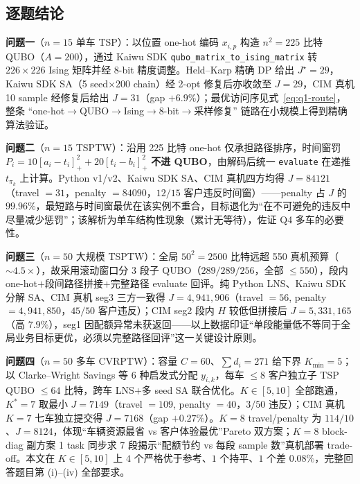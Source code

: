 \documentclass[UTF8,12pt,a4paper]{ctexart}
\begin{document}
\subsection{逐题结论}

\textbf{问题一}（$n=15$ 单车 TSP）：以位置 one-hot 编码 $x_{i,p}$ 构造 $n^{2}=225$ 比特 QUBO（$A=200$），通过 Kaiwu SDK \texttt{qubo\_matrix\_to\_ising\_matrix} 转 $226\!\times\!226$ Ising 矩阵并经 8-bit 精度调整。Held--Karp 精确 DP 给出 $J^{\star}\!=\!29$，Kaiwu SDK SA（5 seed$\times$200 chain）经 2-opt 修复后亦收敛至 $J\!=\!29$，CIM 真机 10 sample 经修复后给出 $J\!=\!31$（gap $+6.9\%$）；最优访问序见式~\eqref{eq:q1-route}，整条 ``one-hot$\to$QUBO$\to$Ising$\to$8-bit$\to$采样修复'' 链路在小规模上得到精确算法验证。

\textbf{问题二}（$n=15$ TSPTW）：沿用 225 比特 one-hot 仅承担路径排序，时间窗罚 $P_i=10[a_i\!-\!t_i]_+^2+20[t_i\!-\!b_i]_+^2$ \textbf{不进 QUBO}，由解码后统一 \texttt{evaluate} 在递推 $t_{\pi_k}$ 上计算。Python v1/v2、Kaiwu SDK SA、CIM 真机四方均得 $J\!=\!84121$（travel $\!=\!31$，penalty $\!=\!84090$，$12/15$ 客户违反时间窗）——penalty 占 $J$ 的 $99.96\%$，最短路与时间窗最优在该实例不重合，目标退化为``在不可避免的违反中尽量减少惩罚''；该解析为单车结构性现象（累计无等待），佐证 Q4 多车的必要性。

\textbf{问题三}（$n=50$ 大规模 TSPTW）：全局 $50^{2}\!=\!2500$ 比特远超 550 真机预算（$\sim 4.5\!\times$），故采用滚动窗口分 $3$ 段子 QUBO（$289/289/256$，全部 $\le 550$），段内 one-hot$+$段间路径拼接$+$完整路径 evaluate 回评。纯 Python LNS、Kaiwu SDK 分解 SA、CIM 真机 seg3 三方一致得 $J\!=\!4{,}941{,}906$（travel $\!=\!56$, penalty $\!=\!4{,}941{,}850$，$45/50$ 客户违反）；CIM seg2 段内 $H$ 较低但拼接后 $J\!=\!5{,}331{,}165$（高 $7.9\%$），seg1 因配额异常未获返回——以上数据印证``单段能量低不等同于全局业务目标更优，必须以完整路径回评''这一关键设计原则。

\textbf{问题四}（$n=50$ 多车 CVRPTW）：容量 $C\!=\!60$、$\sum d_i\!=\!271$ 给下界 $K_{\min}\!=\!5$；以 Clarke--Wright Savings 等 6 种启发式分配 $y_{i,k}$，每车 $\le 8$ 客户独立子 TSP QUBO $\le 64$ 比特，跨车 LNS$+$多 seed SA 联合优化。$K\!\in\![5,10]$ 全部跑通，$K^{*}\!=\!7$ 取最小 $J\!=\!7149$（travel $\!=\!109$, penalty $\!=\!40$，$3/50$ 违反）；CIM 真机 $K\!=\!7$ 七车独立提交得 $J\!=\!7168$（gap $+0.27\%$）。$K=8$ travel/penalty 为 $114/10$、$J=8124$，体现``车辆资源最省 vs 客户体验最优''Pareto 双方案；$K=8$ block-diag 副方案 1 task 同步求 7 段揭示``配额节约 vs 每段 sample 数''真机部署 trade-off。本文在 $K\!\in\![5,10]$ 上 $4$ 个严格优于参考、$1$ 个持平、$1$ 个差 $0.08\%$，完整回答题目第 (i)--(iv) 全部要求。
\end{document}
